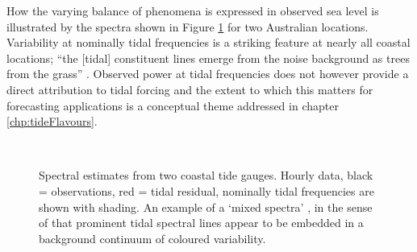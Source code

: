 How the varying balance of phenomena is expressed in observed sea level is illustrated by the spectra shown in Figure \ref{fig:obsSpectraEg} for two Australian locations.   Variability at nominally tidal frequencies is a striking feature at nearly all coastal locations;  ``the [tidal] constituent lines emerge from the noise background as trees from the grass'' \cite{godin:1972}.
Observed power at tidal frequencies does not however provide a direct attribution to tidal forcing and the extent to which this matters for forecasting applications is a conceptual theme addressed in chapter \ref{chp:tideFlavours}.
\begin{figure}[H]\centering
	 \\
	\caption{Spectral estimates from two coastal tide gauges. Hourly data, black = observations, red = tidal residual, nominally tidal frequencies are shown with shading. An example of a `mixed spectra' \citep{Percival:1998tw}, in the sense of that prominent tidal spectral lines appear to be embedded in a background continuum of coloured variability.}
    \label{fig:obsSpectraEg}
\end{figure}

